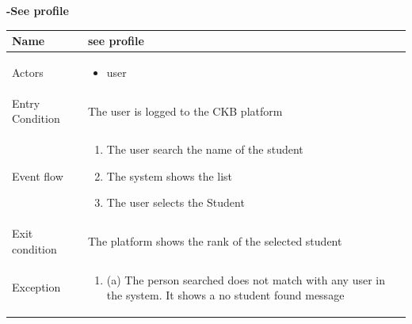 \begin{enumerate}[label=\textbf{[UC\arabic*]}]
        \item  \textbf{-See profile}
    \\ \begin{tabular}{|l|p{11cm}|}
        \hline
        Name & see profile \\
        \hline
        Actors & \begin{itemize}
                    \item user
                \end{itemize} \\
        \hline
        Entry Condition &  The user is logged to the CKB platform\\
        \hline
        Event flow & \begin{enumerate}
            \item The user search the name of the student
            \item The system shows the list
            \item The user selects the Student
        \end{enumerate}\\
        \hline
        Exit condition & The platform shows the rank of the selected student  
        \\
        \hline
        Exception & \begin{enumerate} [label={}, leftmargin=0.25cm ]
            \item (a) The person searched  does not match with any user in the system. It shows a no student found message
        \end{enumerate}\\ 
        \hline            
    \end{tabular}

\newpage


\end{enumerate}
